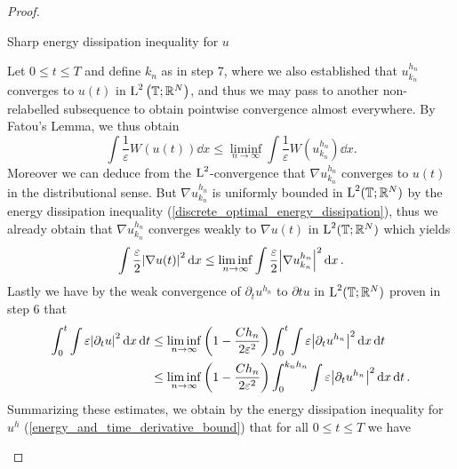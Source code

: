 \begin{proof}
\begin{description}[wide=0pt]
	\item[Step 8:] Sharp energy dissipation inequality for $ u $
	
	Let $ 0 \leq t \leq T $ and define $ k_{ n } $ as in step 7, where we also established that $ u_{ k_{ n } }^{ h_{ n } } $ converges to $ u ( t ) $ in $ \operatorname{L}^{ 2 } \left( \operatorname{\mathbb{T}} ; \mathbb{ R }^{ N } \right) $, and thus we may pass to another non-relabelled subsequence to obtain pointwise convergence almost everywhere. By Fatou's Lemma, we thus obtain
	\begin{equation*}
		\int
			\frac{ 1 }{ \varepsilon }
			W ( u ( t ) ) 
		\dd{ x }
		\leq
		\liminf_{ n \to \infty }
			\int
				\frac{ 1 }{ \varepsilon }
				W ( u_{ k_{ n } }^{ h_{ n } } )
			\dd{ x }.
	\end{equation*}
	Moreover we can deduce from the $ \operatorname{L}^{ 2 } $-convergence that $ \nabla u_{ k_{ n } }^{ h_{ n } } $ converges to $ u( t ) $ in the distributional sense. But $ \nabla u_{ k_{ n } }^{ h_{ n } } $ is uniformly bounded in $ \operatorname{L}^{ 2 } ( \operatorname{\mathbb{T}} ; \mathbb{ R }^{ N } ) $ by the energy dissipation inequality (\ref{discrete_optimal_energy_dissipation}), thus we already obtain that $ \nabla u_{ k_{ n } }^{ h_{ n } } $ converges weakly to $ \nabla u ( t ) $ in $ \operatorname{L}^{ 2 } ( \operatorname{\mathbb{T}}; \mathbb{ R }^{ N } ) $ which yields
	\begin{equation*}
		\int 
			\frac{ \varepsilon }{ 2 }
			\abs{ \nabla u ( t ) }^{ 2 }
		\dd{ x }
		\leq
		\liminf_{ n \to \infty }
			\int
				\frac{ \varepsilon }{ 2 }
				\abs{ \nabla u_{ k_{ n } }^{ h_{ n } } }^{ 2 }
			\dd{ x }.
	\end{equation*}
	Lastly we have by the weak convergence of $ \partial_{ t } u^{ h_{n } } $ to $ \partial{ t} u $ in $\operatorname{L}^{ 2 } ( \operatorname{\mathbb{T}} ; \mathbb{ R }^{ N } ) $ proven in step 6 that
	\begin{align*}
		\int_{ 0 }^{ t }
			\int
				\varepsilon
				\abs{ \partial_{ t } u }^{ 2 }
			\dd{ x }
		\dd{ t }
		& \leq
		\liminf_{ n \to \infty }
			\left( 1 - \frac{ C h_{ n } }{ 2 \varepsilon^{ 2 } } \right)
			\int_{ 0 }^{ t }
				\int
					\varepsilon
					\abs{ \partial_{ t } u^{ h_{ n } } }^{ 2 }
				\dd{ x }
			\dd{ t }
		\\
		& \leq
		\liminf_{ n \to \infty }
			\left( 1 - \frac{ C h_{ n } }{ 2 \varepsilon^{ 2 } } \right)
				\int_{ 0 }^{ k_{ n } h_{ n } }
					\int
						\varepsilon
						\abs{ \partial_{ t } u^{ h_{ n } } }^{ 2 }
					\dd{ x }
				\dd{ t }.		
	\end{align*}
	Summarizing these estimates, we obtain by the energy dissipation inequality for $ u^{ h } $ (\ref{energy_and_time_derivative_bound}) that for all $ 0 \leq t \leq T $ we have

\end{description}
\end{proof}
